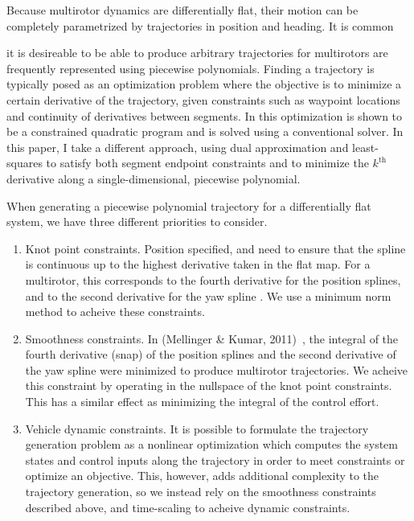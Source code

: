 Because multirotor dynamics are differentially flat, their motion can be completely parametrized by trajectories in position and heading.  It is common

it is desireable to be able to produce arbitrary 
trajectories for multirotors are frequently represented using piecewise polynomials.
Finding a trajectory is typically posed as an optimization problem where the objective is to minimize a certain derivative of the trajectory, given constraints such as waypoint locations and continuity of derivatives between segments.
In \cite{MellingerKumar11,RichterBryRoy16} this optimization is shown to be a constrained quadratic program and is solved using a conventional solver.
In this paper, I take a different approach, using dual approximation and least-squares to satisfy both segment endpoint constraints and to minimize the $k^\text{th}$ derivative along a single-dimensional, piecewise polynomial.

When generating a piecewise polynomial trajectory for a differentially flat system, we have three different priorities to consider.
\begin{enumerate}
	\item Knot point constraints. Position specified, and need to ensure that the spline is continuous up to the highest derivative taken in the flat map.
For a multirotor, this corresponds to the fourth derivative for the position splines, and to the second derivative for the yaw spline \cite{MellingerKumar11}.
We use a minimum norm method to acheive these constraints.
	\item Smoothness constraints. In (Mellinger \& Kumar, 2011)~\cite{MellingerKumar11}, the integral of the fourth derivative (snap) of the position splines 
and the second derivative of the yaw spline were minimized to produce multirotor trajectories. 
We acheive this constraint by operating in the nullspace of the knot point constraints.
This has a similar effect as minimizing the integral of the control effort.
	\item Vehicle dynamic constraints. It is possible to formulate the trajectory generation problem as a nonlinear optimization which computes the system states
and control inputs along the trajectory in order to meet constraints or optimize an objective. 
This, however, adds additional complexity to the trajectory generation, so we instead rely on the smoothness constraints described above, and time-scaling to
acheive dynamic constraints.
\end{enumerate}

